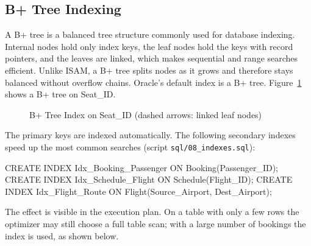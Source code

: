 \documentclass[12pt,a4paper]{article}
\begin{document}
\subsection{B+ Tree Indexing}
A B+ tree is a balanced tree structure commonly used for database indexing. Internal nodes hold only index
keys, the leaf nodes hold the keys with record pointers, and the leaves are linked, which makes sequential
and range searches efficient. Unlike ISAM, a B+ tree splits nodes as it grows and therefore stays balanced
without overflow chains. Oracle's default index is a B+ tree. Figure~\ref{fig:bplus} shows a B+ tree on
Seat_ID.
\begin{figure}[H]
\centering
{}
\caption{B+ Tree Index on Seat\_ID (dashed arrows: linked leaf nodes)}\label{fig:bplus}
\end{figure}
The primary keys are indexed automatically. The following secondary indexes speed up the most common
searches (script \texttt{sql/08\_indexes.sql}):
\begin{code}
CREATE INDEX Idx_Booking_Passenger ON Booking(Passenger_ID);
CREATE INDEX Idx_Schedule_Flight   ON Schedule(Flight_ID);
CREATE INDEX Idx_Flight_Route      ON Flight(Source_Airport, Dest_Airport);
\end{code}
The effect is visible in the execution plan. On a table with only a few rows the optimizer may still choose
a full table scan; with a large number of bookings the index is used, as shown below.
\end{document}
